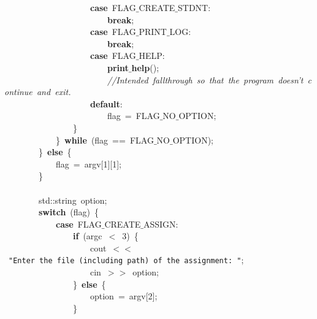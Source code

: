 \mbox{}\ \ \ \ \ \ \ \ \ \ \ \ \ \ \ \ \ \ \ \ \textbf{case}\ FLAG$\_$CREATE$\_$STDNT: \\
\mbox{}\ \ \ \ \ \ \ \ \ \ \ \ \ \ \ \ \ \ \ \ \ \ \ \ \textbf{break}; \\
\mbox{}\ \ \ \ \ \ \ \ \ \ \ \ \ \ \ \ \ \ \ \ \textbf{case}\ FLAG$\_$PRINT$\_$LOG: \\
\mbox{}\ \ \ \ \ \ \ \ \ \ \ \ \ \ \ \ \ \ \ \ \ \ \ \ \textbf{break}; \\
\mbox{}\ \ \ \ \ \ \ \ \ \ \ \ \ \ \ \ \ \ \ \ \textbf{case}\ FLAG$\_$HELP: \\
\mbox{}\ \ \ \ \ \ \ \ \ \ \ \ \ \ \ \ \ \ \ \ \ \ \ \ \textbf{print$\_$help}(); \\
\mbox{}\ \ \ \ \ \ \ \ \ \ \ \ \ \ \ \ \ \ \ \ \ \ \ \ \textit{//Intended\ fallthrough\ so\ that\ the\ program\ doesn't\ continue\ and\ exit.} \\
\mbox{}\ \ \ \ \ \ \ \ \ \ \ \ \ \ \ \ \ \ \ \ \textbf{default}: \\
\mbox{}\ \ \ \ \ \ \ \ \ \ \ \ \ \ \ \ \ \ \ \ \ \ \ \ flag\ =\ FLAG$\_$NO$\_$OPTION; \\
\mbox{}\ \ \ \ \ \ \ \ \ \ \ \ \ \ \ \ \} \\
\mbox{}\ \ \ \ \ \ \ \ \ \ \ \ \}\ \textbf{while}\ (flag\ ==\ FLAG$\_$NO$\_$OPTION); \\
\mbox{}\ \ \ \ \ \ \ \ \}\ \textbf{else}\ \{ \\
\mbox{}\ \ \ \ \ \ \ \ \ \ \ \ flag\ =\ argv[1][1]; \\
\mbox{}\ \ \ \ \ \ \ \ \} \\
\mbox{} \\
\mbox{}\ \ \ \ \ \ \ \ std::string\ option; \\
\mbox{}\ \ \ \ \ \ \ \ \textbf{switch}\ (flag)\ \{ \\
\mbox{}\ \ \ \ \ \ \ \ \ \ \ \ \textbf{case}\ FLAG$\_$CREATE$\_$ASSIGN: \\
\mbox{}\ \ \ \ \ \ \ \ \ \ \ \ \ \ \ \ \textbf{if}\ (argc\ $<$\ 3)\ \{ \\
\mbox{}\ \ \ \ \ \ \ \ \ \ \ \ \ \ \ \ \ \ \ \ cout\ $<$$<$\ \texttt{"{}Enter\ the\ file\ (including\ path)\ of\ the\ assignment:\ "{}}; \\
\mbox{}\ \ \ \ \ \ \ \ \ \ \ \ \ \ \ \ \ \ \ \ cin\ $>$$>$\ option; \\
\mbox{}\ \ \ \ \ \ \ \ \ \ \ \ \ \ \ \ \}\ \textbf{else}\ \{ \\
\mbox{}\ \ \ \ \ \ \ \ \ \ \ \ \ \ \ \ \ \ \ \ option\ =\ argv[2]; \\
\mbox{}\ \ \ \ \ \ \ \ \ \ \ \ \ \ \ \ \} \\

